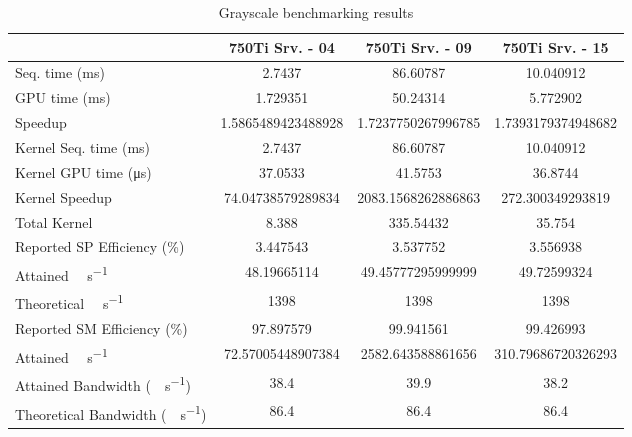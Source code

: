 \begin{table}[H]
	\centering
	\caption{Grayscale benchmarking results}
	\label{tab:grayscale-results}
	\begin{tabular}{lS[table-format=7.1]S[table-format=7.1]S[table-format=7.1]}
		\toprule
			~ & {\textbf{750Ti Srv. - 04}} & {\textbf{750Ti Srv. - 09}} & {\textbf{750Ti Srv. - 15}} \\
		\midrule
			{Seq. time (\si{\milli\second})} & 2.7437 & 86.60787 & 10.040912 \\
			{GPU time (\si{\milli\second})} & 1.729351 & 50.24314 & 5.772902 \\
			{Speedup} & 1.5865489423488928 &1.7237750267996785 & 1.7393179374948682 \\
		\midrule
			{Kernel Seq. time (\si{\milli\second})} & 2.7437 & 86.60787 & 10.040912 \\
			{Kernel GPU time (\si{\micro\second})} & 37.0533 & 41.5753 & 36.8744 \\
			{Kernel Speedup} & 74.04738579289834 & 2083.1568262886863 & 272.300349293819 \\
		\midrule
			{Total Kernel \si{\mega\flops}} & 8.388 & 335.54432 & 35.754 \\
			{Reported SP Efficiency (\si{\percent})} & 3.447543 & 3.537752 & 3.556938 \\
			{Attained \si{\giga\flops\per\second}} & 48.19665114 & 49.45777295999999 & 49.72599324 \\
			{Theoretical \si{\giga\flops\per\second}} & 1398 & 1398 & 1398 \\
		\midrule
			{Reported SM Efficiency (\si{\percent})} & 97.897579 & 99.941561 & 99.426993 \\
			{Attained \si{\giga\iops\per\second}} & 72.57005448907384 & 2582.643588861656 & 310.79686720326293 \\			
		\midrule
			{Attained Bandwidth (\si{\giga\byte\per\second})} & 38.4 & 39.9  & 38.2 \\
			{Theoretical Bandwidth (\si{\giga\byte\per\second})}	& 86.4 & 86.4 & 86.4 \\
		\bottomrule
	\end{tabular}
\end{table}